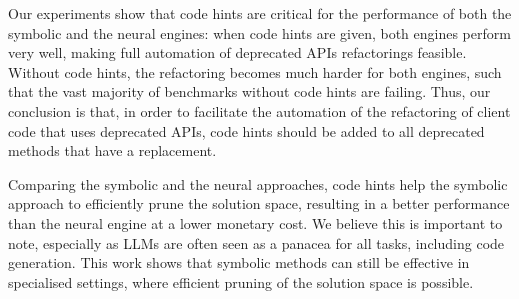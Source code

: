 \documentclass[conference]{IEEEtran}
\begin{document}
Our experiments show that code hints are critical for the performance of
both the symbolic and the neural engines: when code hints are given, both
engines perform very well, making full automation of deprecated APIs
refactorings feasible.  Without code hints, the refactoring becomes much
harder for both engines, such that the vast majority of benchmarks without
code hints are failing.  Thus, our conclusion is that, in order to
facilitate the automation of the refactoring of client code that uses
deprecated APIs, code hints should be added to all deprecated methods that
have a replacement.

Comparing the symbolic and the neural approaches, code hints help the
symbolic approach to efficiently prune the solution space, resulting in a
better performance than the neural engine at a lower monetary cost.  We
believe this is important to note, especially as LLMs are often seen as a
panacea for all tasks, including code generation.  This work shows that
symbolic methods can still be effective in specialised settings, where
efficient pruning of the solution space is possible.





\end{document}

